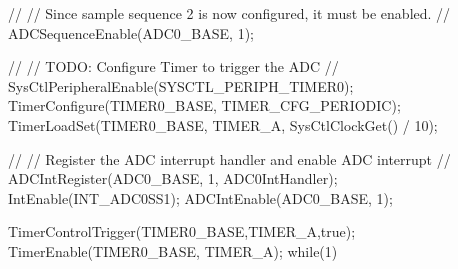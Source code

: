 \documentclass[12pt, a4paper]{article}
\begin{document}
\begin{code}
{    //
    // Since sample sequence 2 is now configured, it must be enabled.
    //
    ADCSequenceEnable(ADC0_BASE, 1);
    
    //
    // TODO: Configure Timer to trigger the ADC
    //
    SysCtlPeripheralEnable(SYSCTL_PERIPH_TIMER0);
    TimerConfigure(TIMER0_BASE, TIMER_CFG_PERIODIC);
    TimerLoadSet(TIMER0_BASE, TIMER_A, SysCtlClockGet() / 10);

    //
    // Register the ADC interrupt handler and enable ADC interrupt
    //
    ADCIntRegister(ADC0_BASE, 1, ADC0IntHandler);
    IntEnable(INT_ADC0SS1);
    ADCIntEnable(ADC0_BASE, 1);

    TimerControlTrigger(TIMER0_BASE,TIMER_A,true);
    TimerEnable(TIMER0_BASE, TIMER_A);
    while(1) {
    }
}
\end{code}
\end{document}
